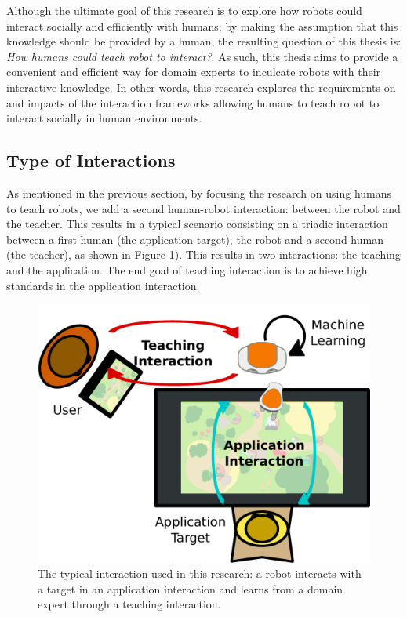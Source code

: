 Although the ultimate goal of this research is to explore how robots could interact socially and efficiently with humans; by making the assumption that this knowledge should be provided by a human, the resulting question of this thesis is: \emph{How humans could teach robot to interact?}. As such, this thesis aims to provide a convenient and efficient way for domain experts to inculcate robots with their interactive knowledge. In other words, this research explores the requirements on and impacts of the interaction frameworks allowing humans to teach robot to interact socially in human environments.

\subsection{Type of Interactions}

As mentioned in the previous section, by focusing the research on using humans to teach robots, we add a second human-robot interaction: between the robot and the teacher. This results in a typical scenario consisting on a triadic interaction between a first human (the application target), the robot and a second human (the teacher), as shown in Figure \ref{fig:intro_setup}). This results in two interactions: the teaching and the application. The end goal of teaching interaction is to achieve high standards in the application interaction. 

\begin{figure}[ht]
	\includegraphics[width=.7\linewidth]{setup.pdf}
	\centering
	\caption{The typical interaction used in this research: a robot interacts with a target in an application interaction and learns from a domain expert through a teaching interaction.}
	\label{fig:intro_setup}
\end{figure}

